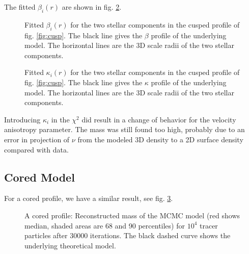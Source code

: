 
The fitted $\beta_i(r)$ are shown in fig. \ref{fig:betai}.

\begin{figure}
    \begin{center}
        \hspace{-7mm}
        \caption{Fitted $\beta_i(r)$ for the two stellar components in the
          cusped profile of fig. \ref{fig:cusp}. The black line gives the
          $\beta$ profile of the underlying model. The horizontal lines are
          the 3D scale radii of the two stellar components.}
        \label{fig:betai}
    \end{center}
\end{figure}



\begin{figure}
    \begin{center}
        \hspace{-7mm}
        \caption{\label{fig:betai} Fitted $\kappa_i(r)$ for the two stellar
          components in the cusped profile of fig. \ref{fig:cusp}. The black
          line gives the $\kappa$ profile of the underlying model. The
          horizontal lines are the 3D scale radii of the two stellar
          components.}
    \end{center}
\end{figure}


Introducing $\kappa_i$ in the $\chi^2$ did  result in a change of
behavior for the velocity anisotropy parameter. The mass was still
found too high, probably due to an error in projection of $\nu$ from
the modeled 3D density to a 2D surface density compared with data.


\subsection{Cored Model}
For a cored profile, we have a similar result, see fig. \ref{fig:core}. 

\begin{figure}
    \begin{center}
        \hspace{-7mm}
        \caption{A cored profile: Reconstructed mass of the MCMC model (red
          shows median, shaded areas are 68 and 90 percentiles) for $10^4$
          tracer particles after 30000 iterations. The black dashed curve
          shows the underlying theoretical model.}
        \label{fig:core}
    \end{center}
\end{figure}


